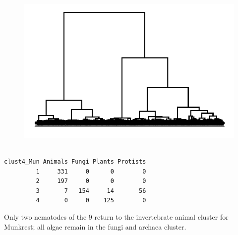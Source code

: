 \documentclass[
  letterpaper,
  DIV=11,
  numbers=noendperiod]{scrreprt}
\newenvironment{Shaded}{}{}
\newcommand{\DecValTok}[1]{\textcolor[rgb]{0.82,0.60,0.40}{#1}}
\newcommand{\FunctionTok}[1]{\textcolor[rgb]{0.38,0.69,0.94}{#1}}
\newcommand{\NormalTok}[1]{\textcolor[rgb]{0.67,0.70,0.75}{#1}}
\newcommand{\OtherTok}[1]{\textcolor[rgb]{0.15,0.68,0.38}{#1}}
\newcommand{\SpecialCharTok}[1]{\textcolor[rgb]{0.34,0.71,0.76}{#1}}
\begin{document}
\begin{figure}[H]

{\centering \includegraphics[width=1\textwidth,height=\textheight]{index_files/figure-pdf/unnamed-chunk-39-1.pdf}

}

\end{figure}

\begin{Shaded}
\end{Shaded}

\begin{verbatim}
          
clust4_Mun Animals Fungi Plants Protists
         1     331     0      0        0
         2     197     0      0        0
         3       7   154     14       56
         4       0     0    125        0
\end{verbatim}

Only two nematodes of the 9 return to the invertebrate animal cluster
for Munkrest; all algae remain in the fungi and archaea cluster.
\end{document}

